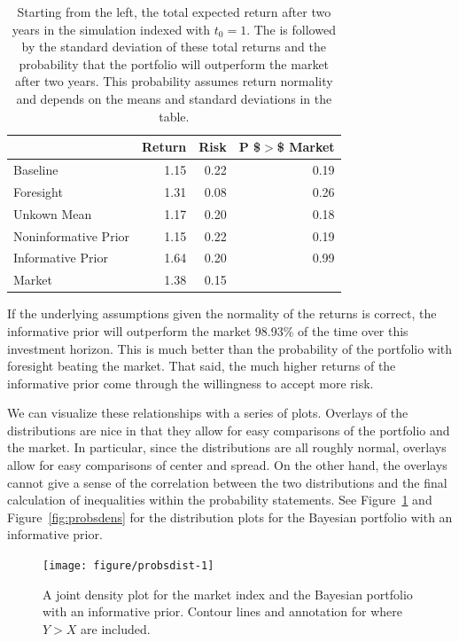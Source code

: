 \documentclass[a4paper]{article}\usepackage[]{graphicx}\usepackage[]{color}
\newenvironment{knitrout}{}{} %
\begin{document}
\begin{table}[ht]
\centering
\begin{tabular}{lrrr}
  \hline
 & Return & Risk & P \$$>$\$ Market  \\ 
  \hline
Baseline & 1.15 & 0.22 & 0.19 \\ 
  Foresight & 1.31 & 0.08 & 0.26 \\ 
  Unkown Mean & 1.17 & 0.20 & 0.18 \\ 
  Noninformative Prior & 1.15 & 0.22 & 0.19 \\ 
  Informative Prior & 1.64 & 0.20 & 0.99 \\ 
  Market & 1.38 & 0.15 &  \\ 
   \hline
\end{tabular}
\caption{Starting from the left, the total expected return after two years in the simulation indexed with $t_0 = 1$. The is followed by the standard deviation of these total returns and the probability that the portfolio will outperform the market after two years. This probability assumes return normality and depends on the means and standard deviations in the table.} 
\label{tab:simulations}
\end{table}


If the underlying assumptions given the normality of the returns is correct, the informative prior will outperform the market 98.93\% of the time over this investment horizon. This is much better than the probability of the portfolio with foresight beating the market. That said, the much higher returns of the informative prior come through the willingness to accept more risk.

We can visualize these relationships with a series of plots. Overlays of the distributions are nice in that they allow for easy comparisons of the portfolio and the market. In particular, since the distributions are all roughly normal, overlays allow for easy comparisons of center and spread. On the other hand, the overlays cannot give a sense of the correlation between the two distributions and the final calculation of inequalities within the probability statements. See Figure~\ref{fig:probsdist} and Figure~\ref{fig:probsdens} for the distribution plots for the Bayesian portfolio with an informative prior.

\begin{knitrout}
\color{fgcolor}\begin{figure}
\texttt{[image: figure/probsdist-1]} \caption[A joint density plot for the market index and the Bayesian portfolio with an informative prior]{A joint density plot for the market index and the Bayesian portfolio with an informative prior. Contour lines and annotation for where $Y > X$ are included.\label{fig:probsdist}}
\end{figure}


\end{knitrout}
\end{document}
